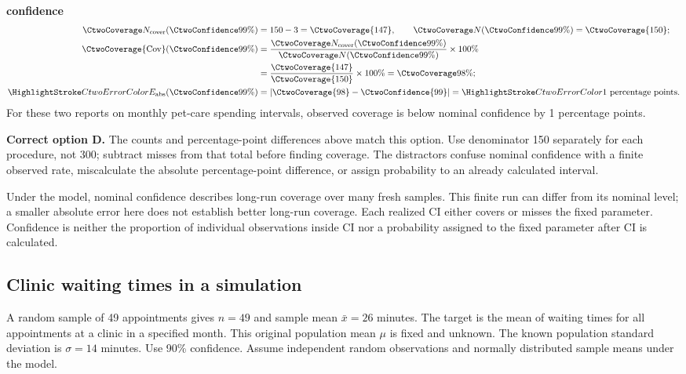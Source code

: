 \textbf{ confidence}\nopagebreak[4]
\begin{align*}
\CtwoCoverCount(\CtwoConfidence{99\%})&=150-3=\CtwoCoverage{147},
\qquad\CtwoTotalCount(\CtwoConfidence{99\%})=\CtwoCoverage{150};\\
\CtwoCoverage{\mathrm{Cov}}(\CtwoConfidence{99\%})
&=\frac{\CtwoCoverCount(\CtwoConfidence{99\%})}{\CtwoTotalCount(\CtwoConfidence{99\%})}\times100\%
\\
&=\frac{\CtwoCoverage{147}}{\CtwoCoverage{150}}\times100\%=\CtwoCoverage{98\%};\\
\CtwoError{E_{\rm abs}}(\CtwoConfidence{99\%})
&=\left|\CtwoCoverage{98}-\CtwoConfidence{99}\right|=\CtwoError{1}\ \text{percentage points}.
\end{align*}
For these two reports on monthly pet-care spending intervals, observed coverage is below nominal confidence by 1 percentage points.

\textbf{Correct option D.} The counts and percentage-point differences above match this option. Use denominator 150 separately for each procedure, not 300; subtract misses from that total before finding coverage. The distractors confuse nominal confidence with a finite observed rate, miscalculate the absolute percentage-point difference, or assign probability to an already calculated interval.

Under the model, nominal confidence describes long-run coverage over many fresh samples. This finite run can differ from its nominal level; a smaller absolute error here does not establish better long-run coverage. Each realized $\mathrm{CI}$ either covers or misses the fixed parameter. Confidence is neither the proportion of individual observations inside $\mathrm{CI}$ nor a probability assigned to the fixed parameter after $\mathrm{CI}$ is calculated.
\par\nopagebreak[4]
\par\vspace{3mm}
\clearpage
\subsection{Clinic waiting times in a simulation}
\label{prob:c2-3}

A random sample of 49 appointments gives $n=49$ and sample mean $\bar{x}=26$ minutes. The target is the mean of waiting times for all appointments at a clinic in a specified month. This original population mean $\mu$ is fixed and unknown. The known population standard deviation is $\sigma=14$ minutes. Use 90\% confidence. Assume independent random observations and normally distributed sample means under the model.

